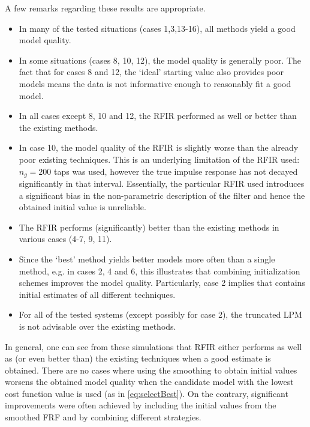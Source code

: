 A few remarks regarding these results are appropriate.
\begin{itemize}
  \item In many of the tested situations (cases 1,3,13-16), all methods yield a good model quality.
  \item In some situations (cases 8, 10, 12), the model quality is generally poor. 
  The fact that for cases 8 and 12, the `ideal' starting value  also provides poor models means the data is not informative enough to reasonably fit a good model.
  \item In all cases except 8, 10 and 12, the RFIR performed as well or better than the existing methods.
  \item In case 10, the model quality of the RFIR is slightly worse than the already poor existing techniques.
  This is an underlying limitation of the RFIR used: $n_g=200$ taps was used, however the true impulse response has not decayed significantly in that interval.
  Essentially, the particular RFIR used introduces a significant bias in the non-parametric description of the filter and hence the obtained initial value is unreliable.
  \item The RFIR performs (significantly) better than the existing methods in various cases (4-7, 9, 11).
  \item Since the `best' method  yields better models more often than a single method, e.g. in cases 2, 4 and 6, this illustrates that combining initialization schemes improves the model quality.
  Particularly, case 2 implies that  contains initial estimates of all different techniques.
  \item For all of the tested systems (except possibly for case 2), the truncated LPM is not advisable over the existing methods.
\end{itemize}

In general, one can see from these simulations that \gls{RFIR} either performs as well as (or even better than) the existing techniques when a good estimate is obtained.
There are no cases where using the smoothing to obtain initial values worsens the obtained model quality when the candidate model with the lowest cost function value is used (as in \eqref{eq:selectBest}).
On the contrary, significant improvements were often achieved by including the initial values from the smoothed FRF and by combining different strategies.

